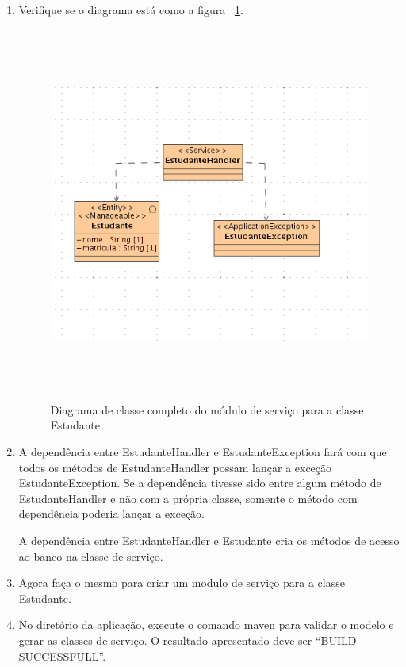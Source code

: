 \begin{enumerate}
\item Verifique se o diagrama está como a figura
~\ref{resultado_diagrama_classe_servico}.
\begin{figure}[!htb]
	\centering
	\includegraphics[width=300pt,height=350pt]{imgs/tutorial-mdarte-0011.png}
	\caption{Diagrama de classe completo do módulo de serviço para a classe
	Estudante.}
	\label{resultado_diagrama_classe_servico}
\end{figure}

\item A dependência entre EstudanteHandler e EstudanteException fará com que todos os métodos de EstudanteHandler possam lançar a exceção EstudanteException. Se a dependência tivesse sido entre algum método de EstudanteHandler e não com a própria classe, somente o método com dependência poderia lançar a exceção.

A dependência entre EstudanteHandler e Estudante cria os métodos de acesso ao banco na classe de serviço.

\item Agora faça o mesmo para criar um modulo de serviço para a classe Estudante.
	
\item No diretório da aplicação, execute o comando maven para validar o modelo e gerar as classes de serviço. O resultado apresentado deve ser “BUILD SUCCESSFULL”.
\end{enumerate}

